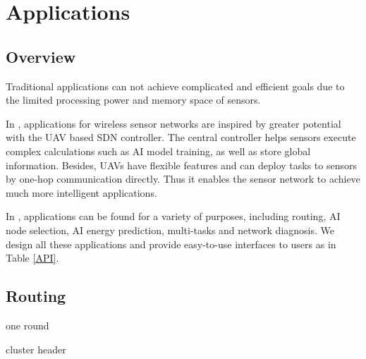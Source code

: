 \section{Applications}
\label{App}

\subsection{Overview}

Traditional applications can not achieve complicated and efficient goals due 
to the limited processing power and memory space of sensors.

In {\sdn}, applications for wireless sensor networks are inspired by 
greater potential with the UAV based SDN controller. The central controller
helps sensors execute complex calculations such as AI model training, as well 
as store global information. Besides, UAVs have flexible features and can deploy 
tasks to sensors by one-hop communication directly. Thus it enables the sensor network
to achieve much more intelligent applications.

In {\sdn}, applications can be found for a variety of purposes, including routing, AI node selection,
AI energy prediction, multi-tasks and network diagnosis. We design all these applications and provide 
easy-to-use interfaces to users as in Table \ref{API}.



\subsection{Routing}

one round

cluster header

\begin{table}[htbp]
	\caption{Flow Table}
	\label{FT}
	\centering
\end{table}

\begin{table}[htbp]
	\caption{Header Fields}
	\label{HF}
	\centering
\end{table}

